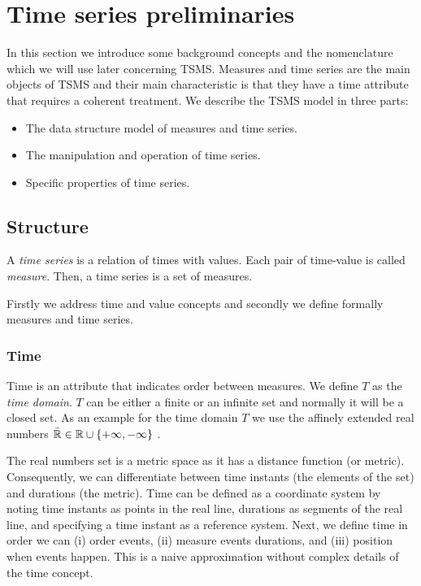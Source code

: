

\section{Time series preliminaries}
\label{sec:model:preliminaries}


In this section we introduce some background concepts and the
nomenclature which we will use later concerning TSMS. Measures and
time series are the main objects of TSMS and their main characteristic
is that they have a time attribute that requires a coherent
treatment. We describe the TSMS model in three parts:

\begin{itemize}
\item The data structure model of measures and time series.
\item The manipulation and operation of time series.
\item Specific properties of time series.
\end{itemize}



\subsection{Structure}

A \emph{time series} is a relation of times with values. Each pair of
time-value is called \emph{measure}. Then, a time series is a set of
measures. 

Firstly we address time and value concepts and secondly we define formally
measures and time series.


\subsubsection{Time}

Time is an attribute that indicates order between measures. We define
$T$ as the \emph{time domain}. $T$ can be either a finite or an infinite set
and normally it will be a closed set. As an example for the time
domain $T$ we use the affinely extended real numbers $\bar{\mathbb{R}} \in \mathbb{R} \cup
\{+\infty,-\infty\}$ \cite{cantrell:extendedreal}.

The real numbers set is a metric space as it has a distance function
(or metric). Consequently, we can differentiate between time instants
(the elements of the set) and durations (the metric). Time can be
defined as a coordinate system
\cite{iep:time-supplement,kopetz11:realtime} by noting time instants
as points in the real line, durations as segments of the real line,
and specifying a time instant as a reference system. Next, we define
time in order we can (i) order events, (ii) measure events durations,
and (iii) position when events happen. This is a naive approximation
without complex details of the time concept.

